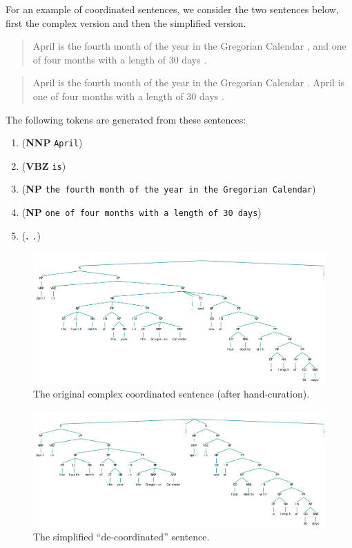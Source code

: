 \documentclass{article}
\begin{document}
For an example of coordinated sentences, we consider the two sentences below, first the complex version and then the simplified version.

\begin{quote}
April is the fourth month of the year in the Gregorian Calendar , and one of four months with a length of 30 days . 
\end{quote}

\begin{quote}
April is the fourth month of the year in the Gregorian Calendar . April is one of four months with a length of 30 days .
\end{quote}

The following tokens are generated from these sentences:

\begin{enumerate}
\item (\textbf{NNP} \texttt{April})
\item (\textbf{VBZ} \texttt{is})
\item (\textbf{NP} \texttt{the fourth month of the year in the Gregorian Calendar})
\item (\textbf{NP} \texttt{one of four months with a length of 30 days})
\item (\textbf{.} \texttt{.})
\end{enumerate}

\begin{figure}
\includegraphics[scale=.45]{coord_tree}
\caption{The original complex coordinated sentence (after hand-curation).}
\end{figure}

\begin{figure}
\includegraphics[scale=.41]{simp_coord}
\caption{The simplified ``de-coordinated'' sentence.}
\end{figure}
\end{document}
